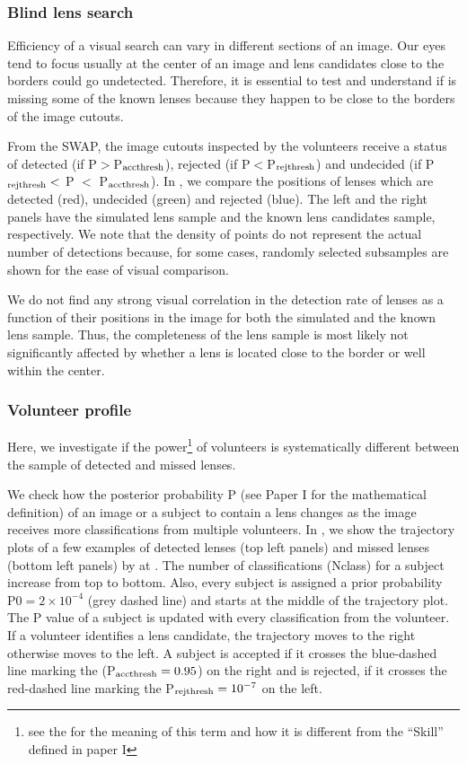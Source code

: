\documentclass[useAMS,usenatbib,a4paper]{mn2e}
\begin{document}
\subsubsection{Blind lens search}
Efficiency of a visual search can vary in different sections of an
image. Our eyes tend to focus usually at the center of an image and lens
candidates close to the borders could go undetected. Therefore, it is
essential to test and understand if \sw is missing some of the known lenses
because they happen to be close to the borders of the image cutouts.

From the SWAP, the image cutouts inspected by the \sw volunteers receive
a status of detected (if P$>$P$_{\rm acc thresh}$), rejected (if
P$<$P$_{\rm rej thresh}$) and undecided (if P$_{\rm rej thresh}<$ P $<$
P$_{\rm acc thresh}$). In , we compare the positions
of lenses which are detected (red), undecided (green) and rejected
(blue). The left and the right panels have the simulated lens sample and
the known lens candidates sample, respectively. We note that the density
of points do not represent the actual number of detections because, for some
cases, randomly selected subsamples are shown for the ease of visual
comparison.

We do not find any strong visual correlation in the detection rate of
lenses as a function of their positions in the image for both the
simulated and the known lens sample. Thus, the completeness of the lens
sample is most likely not significantly affected by whether a lens is
located close to the border or well within the center.

\subsubsection{Volunteer profile}

Here, we investigate if the power\footnote{see the
 for the meaning of this term and how it is
different from the ``Skill'' defined in paper I} of volunteers is systematically
different between the sample of detected and missed lenses.

We check how the posterior probability P (see Paper I for the
mathematical definition) of an image or a subject to contain a lens
changes as the image receives more classifications from multiple
volunteers.  In , we show the trajectory plots of a few
examples of detected lenses (top left panels) and missed lenses (bottom
left panels) by \sw at \StageOne. The number of classifications (Nclass)
for a subject increase from top to bottom.  Also, every subject is
assigned a prior probability P0$=2\times10^{-4}$ (grey dashed line) and
starts at the middle of the trajectory plot. The P value of a subject is
updated with every classification from the volunteer.  If a volunteer
identifies a lens candidate, the trajectory moves to the right otherwise
moves to the left. A subject is accepted if it crosses the blue-dashed
line marking the (P$_{\rm acc thresh}=0.95$) on the right and is
rejected, if it crosses the red-dashed line marking the P$_{\rm rej
thresh}=10^{-7}$ on the left.
\end{document}
